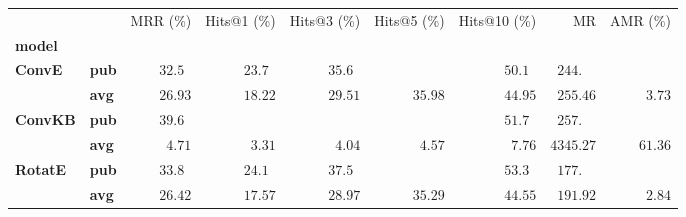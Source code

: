 \begin{tabular}{llrrrrrrr}
\toprule
       &     &           MRR (\%) &        Hits@1 (\%) &        Hits@3 (\%) &        Hits@5 (\%) &       Hits@10 (\%) &                             MR &           AMR (\%) \\
\textbf{model} & {} &                    &                    &                    &                    &                    &                                &                    \\
\midrule
\textbf{ConvE} & \textbf{pub} &  $32.5\phantom{0}$ &  $23.7\phantom{0}$ &  $35.6\phantom{0}$ &                    &  $50.1\phantom{0}$ &  $\phantom{0}244.\phantom{00}$ &                    \\
       & \textbf{avg} &            $26.93$ &            $18.22$ &            $29.51$ &            $35.98$ &            $44.95$ &            $\phantom{0}255.46$ &  $\phantom{0}3.73$ \\\midrule
\textbf{ConvKB} & \textbf{pub} &  $39.6\phantom{0}$ &                    &                    &                    &  $51.7\phantom{0}$ &  $\phantom{0}257.\phantom{00}$ &                    \\
       & \textbf{avg} &  $\phantom{0}4.71$ &  $\phantom{0}3.31$ &  $\phantom{0}4.04$ &  $\phantom{0}4.57$ &  $\phantom{0}7.76$ &                      $4345.27$ &            $61.36$ \\\midrule
\textbf{RotatE} & \textbf{pub} &  $33.8\phantom{0}$ &  $24.1\phantom{0}$ &  $37.5\phantom{0}$ &                    &  $53.3\phantom{0}$ &  $\phantom{0}177.\phantom{00}$ &                    \\
       & \textbf{avg} &            $26.42$ &            $17.57$ &            $28.97$ &            $35.29$ &            $44.55$ &            $\phantom{0}191.92$ &  $\phantom{0}2.84$ \\
\bottomrule
\end{tabular}

